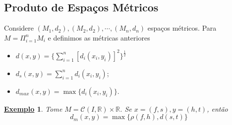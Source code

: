 \documentclass{article}
\newtheorem{example}{\underline{Exemplo}}
\begin{document}
\subsection{Produto de Espaços Métricos}
Considere \((M_{1}, d_{2}), (M_{2}, d_{2}), \cdots, (M_{n}, d_{n})\) espaços métricos. Para \(M=\Pi_{i=1}^{n}M_{i}\) e definimos as métricas anteriores
\begin{itemize}
  \item \(d(x, y) = \biggl\{\sum\limits_{i=1}^{n}[d_{i}(x_{i}, y_{i})]^{2}\biggr\}^{\frac{1}{2}}\)
  \item \(d_{s}(x, y) = \sum\limits_{i=1}^{n}d_{i}(x_{i}, y_{i})\);
  \item \(d_{max}(x, y) = \max\{d_{i}(x_{i}, y_{i})\}\).
\end{itemize}
\begin{example}
  Tome \(M = \mathcal{C}(I, \mathbb{R})\times \mathbb{R}\). Se \(x = (f, s), y=(h, t)\), então 
    \[
      d_{m}(x, y) = \max \biggl\{\rho (f, h), d(s, t)\biggr\}
    \]
\end{example}
\end{document}
